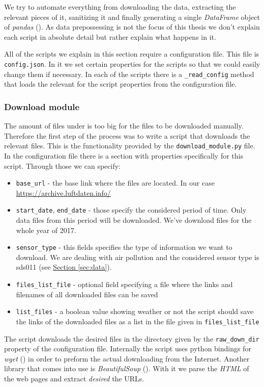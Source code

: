 \documentclass[12pt,a4paper,twoside]{scrartcl}
\numberwithin{equation}{section}
\newcommand{\refsec}[1]{\hyperref[#1]{Section \ref*{#1}}}
\begin{document}
We try to automate everything from downloading the data, extracting the relevant pieces of it, sanitizing it and finally generating a single \emph{DataFrame} object of \emph{pandas} (\cite{pandas}). As data prepossessing is not the focus of this thesis we don't explain each script in absolute detail but rather explain what happens in it.

All of the scripts we explain in this section require a configuration file. This file is \texttt{config.json}. In it we set certain properties for the scripts so that we could easily change them if necessary. In each of the scripts there is a \texttt{\_read\_config} method that loads the relevant for the script properties from the configuration file.
\subsubsection{Download module}
\label{sec:down-module}
The  amount of files under \cite{datalink}  is too big for the files to be downloaded manually. Therefore the first step of the process was to write a script that downloads the relevant files. This is the functionality provided by the \texttt{download\_module.py} file. In the configuration file there is a section with properties specifically for this script. Through those we can specify:
\begin{itemize}
\item \texttt{base\_url} - the base link where the files are located. In our case \url{https://archive.luftdaten.info/}
\item \texttt{start\_date}, \texttt{end\_date} - those specify the considered period of time. Only data files from this period will be downloaded. We've download files for the whole year of 2017.
\item \texttt{sensor\_type} - this fields specifies the type of information we want to download. We are dealing with air pollution and the considered sensor type is sds011 (see \refsec{sec:data}).
\item \texttt{files\_list\_file} - optional field specifying a file where the links and filenames of all downloaded files can be saved
\item \texttt{list\_files} - a boolean value showing weather or not the script should save the links of the downloaded files as a list in the file given in \texttt{files\_list\_file}
\end{itemize}
The script downloads the desired files in the directory given by the \texttt{raw\_down\_dir} property of the configuration file. Internally the script uses python bindings for \emph{wget} (\cite{wget}) in order to preform the actual downloading from the Internet. Another library that comes into use is \emph{BeautifulSoup} (\cite{bs}). With it we parse the \emph{HTML} of the web pages and extract \emph{desired} the URLs.
\end{document}
